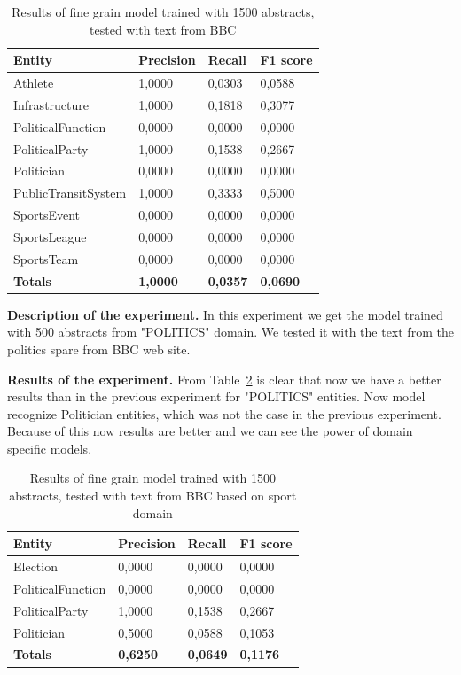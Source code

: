 \documentclass[thesis=M,english]{FITthesis}[2018/05/30]
\begin{document}
\begin{table}[H]\centering
	\begin{tabular}{|l|l|l|l|}
		\hline {\textbf{Entity}} & {\textbf{Precision}} & {\textbf{Recall}} & {\textbf{F1 score}}\\\hline
        Athlete & 1,0000 & 0,0303 & 0,0588\\
 		Infrastructure & 1,0000 & 0,1818 & 0,3077\\
		PoliticalFunction & 0,0000 & 0,0000&  0,0000\\  
 		PoliticalParty & 1,0000 & 0,1538 & 0,2667\\  
     	Politician & 0,0000 & 0,0000 & 0,0000\\
		PublicTransitSystem & 1,0000 & 0,3333 & 0,5000\\ 
    	SportsEvent & 0,0000 & 0,0000 & 0,0000\\
   		SportsLeague & 0,0000 & 0,0000 & 0,0000\\ 
    	SportsTeam & 0,0000 & 0,0000 & 0,0000\\\hline  
		\textbf{Totals} & \textbf{1,0000} & \textbf{0,0357} & \textbf{0,0690 }\\\hline
	\end{tabular}			
		\caption{Results of fine grain model trained with 1500 abstracts, tested with text from BBC\label{table:BBCWith1500Model}}
	\end{table}

\textbf{Description of the experiment.} In this experiment we get the model trained with 500 abstracts from "POLITICS" domain. We tested it with the text from the politics spare from BBC web site.

\textbf{Results of the experiment.} From Table~\ref{table:BBCPoliticsWith500SportModel} is clear that now we have a better results than in the previous experiment for "POLITICS" entities. Now model recognize Politician entities, which was not the case in the previous experiment. Because of this now results are better and we can see the power of domain specific models. 
	
	\begin{table}[H]\centering
	\begin{tabular}{|l|l|l|l|}
		\hline {\textbf{Entity}} & {\textbf{Precision}} & {\textbf{Recall}} & {\textbf{F1 score}}\\\hline
		Election & 0,0000 & 0,0000 & 0,0000\\
		PoliticalFunction & 0,0000 & 0,0000 &  0,0000\\  
 		PoliticalParty & 1,0000 & 0,1538 & 0,2667\\  
     	Politician & 0,5000 & 0,0588 & 0,1053\\\hline
		\textbf{Totals} & \textbf{0,6250} & \textbf{0,0649} & \textbf{0,1176 }\\\hline
	\end{tabular}			
		\caption{Results of fine grain model trained with 1500 abstracts, tested with text from BBC based on sport domain\label{table:BBCPoliticsWith500SportModel}}
	\end{table}
	
\end{document}

